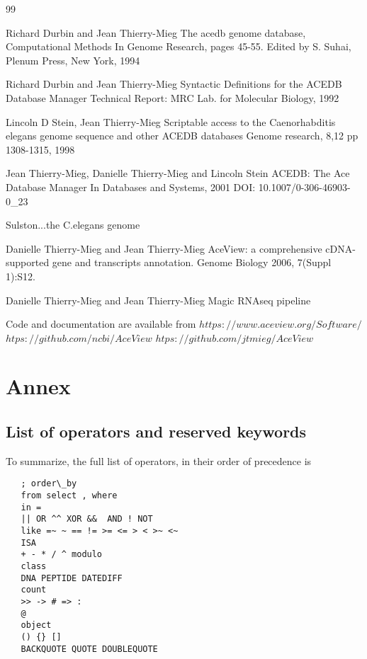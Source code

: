 \documentclass[11pt]{article}
\newcommand{\BL}{\begin{lstlisting}}
\begin{document}
%%%%%%%%%%%%%%%%%%%%%%%%%%%%%%%%%%%%%%%%%%%%%%%%%%%%%%%%%%%%%%%%
% SECTION
%%%%%%%%%%%%%%%%%%%%%%%%%%%%%%%%%%%%%%%%%%%%%%%%%%%%%%%%%%%%%%%%
\begin{thebibliography}{99}

Richard Durbin and Jean Thierry-Mieg
The acedb genome database,
Computational Methods In Genome Research, pages 45-55.
Edited by S. Suhai, Plenum Press, New York, 1994

Richard Durbin and Jean Thierry-Mieg
Syntactic Definitions for the ACEDB Database Manager
Technical Report: MRC Lab. for Molecular Biology, 1992

Lincoln D Stein, Jean Thierry-Mieg
Scriptable access to the Caenorhabditis elegans genome sequence and other ACEDB databases
Genome research, 8,12 pp 1308-1315, 1998

Jean Thierry-Mieg, Danielle Thierry-Mieg and Lincoln Stein
ACEDB: The Ace Database Manager
In Databases and Systems, 2001
DOI: 10.1007/0-306-46903-0\_23


Sulston...the C.elegans genome

Danielle Thierry-Mieg and Jean Thierry-Mieg
AceView: a comprehensive cDNA-supported gene and transcripts annotation.
Genome Biology 2006, 7(Suppl 1):S12.  

Danielle Thierry-Mieg and Jean Thierry-Mieg
Magic RNAseq pipeline


Code and documentation are available from  
$https://www.aceview.org/Software/$ 
$htps://github.com/ncbi/AceView$ 
$htps://github.com/jtmieg/AceView$ 


\end{thebibliography}


%%%%%%%%%%%%%%%%%%%%%%%%%%%%%%%%%%%%%%%%%%%%%%%%%%%%%%%%%%%%%%%%
% SECTION
%%%%%%%%%%%%%%%%%%%%%%%%%%%%%%%%%%%%%%%%%%%%%%%%%%%%%%%%%%%%%%%%
\appendix
\section {Annex}
%%%%%%%%%%%%%%%%%%%%%%%%%%%%%%%%%%%%%%%%%%%%%%%%%%%%%%%%%%%%%%%%
% SECTION
%%%%%%%%%%%%%%%%%%%%%%%%%%%%%%%%%%%%%%%%%%%%%%%%%%%%%%%%%%%%%%%%
\subsection{List of operators and reserved keywords}

To summarize, the full list of operators, in their order of precedence is
\BL
   ; order\_by
   from select , where
   in = 
   || OR ^^ XOR &&  AND ! NOT
   like =~ ~ == != >= <= > < >~ <~
   ISA
   + - * / ^ modulo
   class
   DNA PEPTIDE DATEDIFF 
   count
   >> -> # => :
   @
   object
   () {} []
   BACKQUOTE QUOTE DOUBLEQUOTE 
\end{lstlisting}
\end{document}
